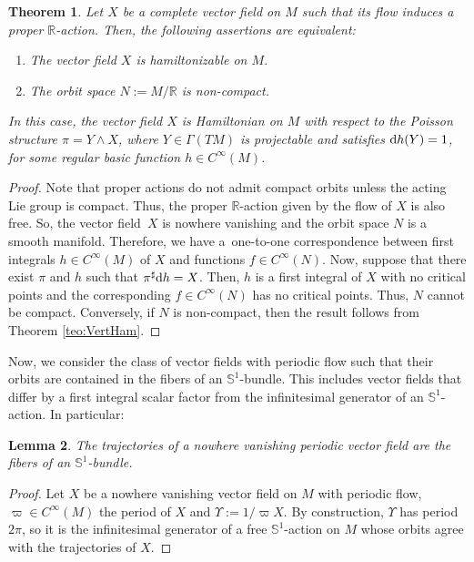 \documentclass[10pt,a4paper]{amsart}
\newcommand{\dd}{{\rm d}}
\numberwithin{equation}{section}
\newtheorem{Theorem}{Theorem}[section]
\newtheorem{Lemma}[Theorem]{Lemma}
\begin{document}
\begin{Theorem}\label{teo:ProperHam}
Let $X$ be a complete vector field on $M$ such that its flow induces a proper $\mathbb{R}$-action. Then, the following assertions are equivalent:
 \begin{enumerate}\itemsep=0pt
 \item[$1.$] The vector field $X$ is hamiltonizable on $M$.
 \item[$2.$] The orbit space $N := M / \mathbb{R}$ is non-compact.
 \end{enumerate}
In this case, the vector field $X$ is Hamiltonian on $M$ with respect to the Poisson structure $\pi = Y \wedge X$, where $Y \in \Gamma(TM)$ is projectable and satisfies $\dd{h}(Y)=1$, for some regular basic function $h \in C^{\infty}(M)$.
\end{Theorem}
\begin{proof}
Note that proper actions do not admit compact orbits unless the acting Lie group is compact. Thus, the proper $\mathbb{R}$-action given by the flow of $X$ is also free. So, the vector field~$X$ is nowhere vanishing and the orbit space $N$ is a smooth manifold. Therefore, we have a~one-to-one correspondence between first integrals $h \in C^{\infty}(M)$ of $X$ and functions $f \in C^{\infty}(N)$. Now, suppose that there exist $\pi$ and $h$ such that $\pi^{\sharp}\dd h = X$. Then, $h$ is a first integral of $X$ with no critical points and the corresponding $f \in C^{\infty}(N)$ has no critical points. Thus, $N$ cannot be compact. Conversely, if $N$ is non-compact, then the result follows from Theorem \ref{teo:VertHam}.
\end{proof}

Now, we consider the class of vector fields with periodic flow such that their orbits are contained in the fibers of an $\mathbb{S}^1$-bundle. This includes vector fields that differ by a first integral scalar factor from the infinitesimal generator of an $\mathbb{S}^{1}$-action. In particular:

\begin{Lemma}\label{lemma:Periodic}
 The trajectories of a nowhere vanishing periodic vector field are the fibers of an $\mathbb{S}^1$-bundle.
\end{Lemma}
\begin{proof}
Let $X$ be a nowhere vanishing vector field on $M$ with periodic flow, $\varpi\in C^{\infty}(M)$ the period of $X$ and $\Upsilon:=1/\varpi X$. By construction, $\Upsilon$ has period $2\pi$, so it is the infinitesimal generator of a free $\mathbb{S}^1$-action on $M$ whose orbits agree with the trajectories of $X$.
\end{proof}
\end{document}
